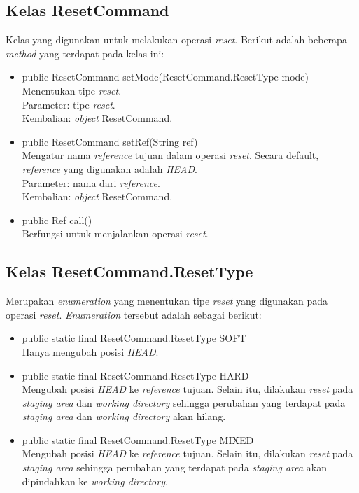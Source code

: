 \subsection{Kelas ResetCommand}
\label{subsec:resetcommand}
Kelas yang digunakan untuk melakukan operasi \textit{reset}.
Berikut adalah beberapa \textit{method} yang terdapat pada kelas ini:
\begin{itemize}
\item public ResetCommand setMode(ResetCommand.ResetType mode)\\
Menentukan tipe \textit{reset}.\\ 
Parameter: tipe \textit{reset}.\\
Kembalian: \textit{object} ResetCommand.
\item public ResetCommand setRef(String ref)\\
Mengatur nama \textit{reference} tujuan dalam operasi \textit{reset}. Secara default, \textit{reference} yang digunakan adalah \textit{HEAD}.\\
Parameter: nama dari \textit{reference}.\\
Kembalian: \textit{object} ResetCommand.
\item public Ref call()\\
Berfungsi untuk menjalankan operasi \textit{reset}.\\
\end{itemize}

\subsection{Kelas ResetCommand.ResetType}
\label{subsec:resettype}
Merupakan \textit{enumeration} yang menentukan tipe \textit{reset} yang digunakan pada operasi \textit{reset}.
\textit{Enumeration} tersebut adalah sebagai berikut:
\begin{itemize}
\item public static final ResetCommand.ResetType SOFT\\
Hanya mengubah posisi \textit{HEAD}. 


\item public static final ResetCommand.ResetType HARD\\
Mengubah posisi \textit{HEAD} ke \textit{reference} tujuan. Selain itu, dilakukan \textit{reset} pada \textit{staging area} dan \textit{working directory} sehingga perubahan yang terdapat pada \textit{staging area} dan \textit{working directory} akan hilang.


\item public static final ResetCommand.ResetType MIXED\\
Mengubah posisi \textit{HEAD} ke \textit{reference} tujuan. Selain itu, dilakukan \textit{reset} pada \textit{staging area} sehingga perubahan yang terdapat pada \textit{staging area} akan dipindahkan ke \textit{working directory}. 
\end{itemize}


